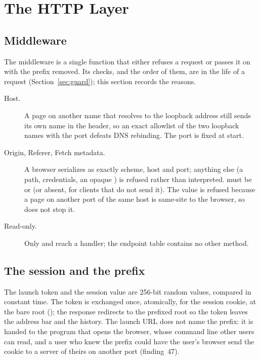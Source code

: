 \section{The HTTP Layer}

\subsection{Middleware}

The middleware is a single function that either refuses a request or passes it on with
the prefix removed.  Its checks, and the order of them, are in the life of a request
(Section~\ref{sec:guard}); this section records the reasons.

\begin{description}
  \item[Host.]  A page on another name that resolves to the loopback address still
        sends its own name in the  header, so an exact allowlist of the two
        loopback names with the port defeats DNS rebinding.  The port is fixed at start.
  \item[Origin, Referer, Fetch metadata.]  A browser serializes  as exactly
        scheme, host and port; anything else (a path, credentials, an opaque ) is
        refused rather than interpreted.   must be  or
         (or absent, for clients that do not send it).  The value
         is refused because a page on another port of the same host is
        same-site to the browser, so  does not stop it.
  \item[Read-only.]  Only  and  reach a handler; the endpoint table
        contains no other method.
\end{description}

\subsection{The session and the prefix}

The launch token and the session value are 256-bit random values, compared in constant
time.  The token is exchanged once, atomically, for the session cookie, at the bare root
(); the response redirects to the prefixed root so the token leaves the
address bar and the history.  The launch URL does not name the prefix: it is handed to the
program that opens the browser, whose command line other users can read, and a user who
knew the prefix could have the user's browser send the cookie to a server of theirs on
another port (finding~47).

